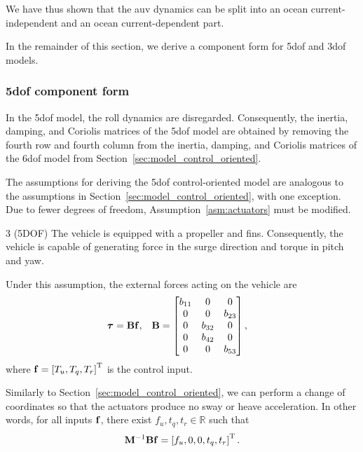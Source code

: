 We have thus shown that the \gls{auv} dynamics can be split into an ocean current-independent and an ocean current-dependent part.

In the remainder of this section, we derive a component form for 5\gls{dof} and 3\gls{dof} models.

\subsubsection{5\gls{dof} component form}
In the 5\gls{dof} model, the roll dynamics are disregarded.
Consequently, the inertia, damping, and Coriolis matrices of the 5\gls{dof} model are obtained by removing the fourth row and fourth column from the inertia, damping, and Coriolis matrices of the 6\gls{dof} model from Section~\ref{sec:model_control_oriented}.

The assumptions for deriving the 5\gls{dof} control-oriented model are analogous to the assumptions in Section~\ref{sec:model_control_oriented}, with one exception.
Due to fewer degrees of freedom, Assumption~\ref{asm:actuators} must be modified.

\begin{customasm}{3 (5DOF)}
    \label{asm:actuators_5DOF}
    The vehicle is equipped with a propeller and fins.
    Consequently, the vehicle is capable of generating force in the surge direction and torque in pitch and yaw.
\end{customasm}
Under this assumption, the external forces acting on the vehicle are
\begin{align}
    \bm{\tau} &= \mathbf{B}\mathbf{f}, &
    \mathbf{B} &= 
    \begin{bmatrix}
        b_{11} & 0 & 0 \\ 0 & 0 & b_{23} \\ 0 & b_{32} & 0 \\ 0 & b_{42} & 0 \\ 0 & 0 & b_{53}
    \end{bmatrix},
\end{align}
where $\mathbf{f} = \left[T_u, T_q, T_r\right]^{\mathrm{T}}$ is the control input.

Similarly to Section~\ref{sec:model_control_oriented}, we can perform a change of coordinates so that the actuators produce no sway or heave acceleration.
In other words, for all inputs $\mathbf{f}$, there exist $f_u, t_q, t_r \in \mathbb{R}$ such that
\begin{equation}
    \mathbf{M}^{-1}\mathbf{B}\mathbf{f} = \left[f_u, 0, 0, t_q, t_r\right]^{\mathrm{T}}.
\end{equation}

